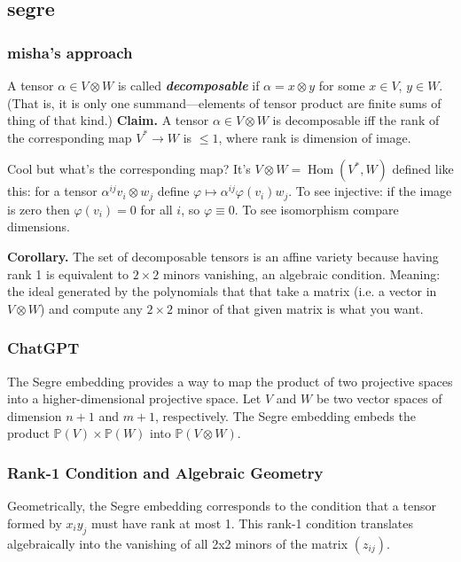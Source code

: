 \subsection{segre}


\subsubsection{misha's approach}

A tensor \(\alpha \in V \otimes W\) is called \textit{\textbf{decomposable}} if  \(\alpha=x \otimes y \) for some \(x \in V\), \(y \in W\). (That is, it is only one summand---elements of tensor product are finite sums of thing of that kind.) \textbf{Claim.} A tensor \(\alpha \in V \otimes W\) is decomposable iff the rank of the corresponding map \(V^* \to W\) is \(\leq 1\), where rank is dimension of image.

Cool but what's the corresponding map? It's \(V \otimes W =\operatorname{Hom}(V^*,W)\) defined like this: for a tensor \(\alpha^{ij}v_i \otimes w_j\) define \(\varphi \mapsto \alpha^{ij}\varphi(v_i)w_j\). To see injective: if the image is zero then \(\varphi(v_i)=0\) for all \(i\), so \(\varphi\equiv 0\). To see isomorphism compare dimensions.

\textbf{Corollary.} The set of decomposable tensors is an affine variety because having rank 1 is equivalent to \(2 \times 2\) minors vanishing, an algebraic condition. Meaning: the ideal generated by the polynomials that that take a matrix (i.e. a vector in \(V \otimes W\)) and compute any \(2\times 2\) minor of that given matrix is what you want.

\subsubsection{ChatGPT}
The Segre embedding provides a way to map the product of two projective spaces into a higher-dimensional projective space. Let \( V \) and \( W \) be two vector spaces of dimension \( n+1 \) and \( m+1 \), respectively. The Segre embedding embeds the product \( \mathbb{P}(V) \times \mathbb{P}(W) \) into \( \mathbb{P}(V \otimes W) \).


\subsubsection*{Rank-1 Condition and Algebraic Geometry}

Geometrically, the Segre embedding corresponds to the condition that a tensor formed by \( x_i y_j \) must have rank at most 1. This rank-1 condition translates algebraically into the vanishing of all 2x2 minors of the matrix \( (z_{ij}) \).

